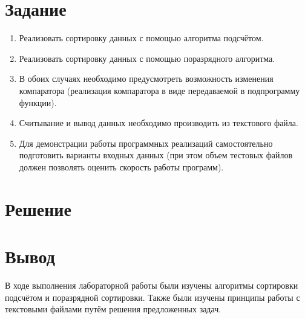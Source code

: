 \documentclass[a4paper,14pt]{extarticle}
\begin{document}
	\section*{Задание}
	\begin{enumerate}
		\item Реализовать сортировку данных с помощью алгоритма подсчётом.
		
		\item Реализовать сортировку данных с помощью поразрядного алгоритма.
		
		\item В обоих случаях необходимо предусмотреть возможность изменения компаратора (реализация компаратора в виде передаваемой в подпрограмму функции).
		
		\item Считывание и вывод данных необходимо производить из текстового файла.
		
		\item Для демонстрации работы программных реализаций самостоятельно подготовить варианты входных данных (при этом объем тестовых файлов должен позволять оценить скорость работы программ).
	\end{enumerate}
	
	\pagebreak
	\section*{Решение}
	
	\section*{Вывод}
	В ходе выполнения лабораторной работы были изучены алгоритмы сортировки подсчётом и поразрядной сортировки. Также были изучены принципы работы с текстовыми файлами путём решения предложенных задач.
\end{document}
